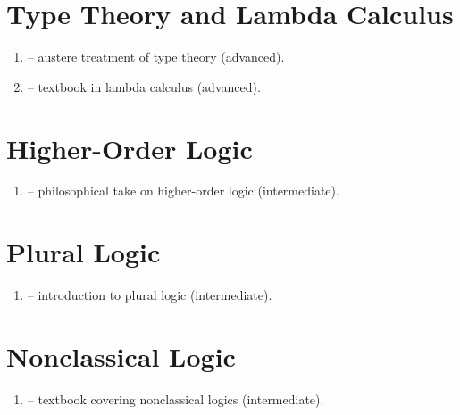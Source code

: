 \documentclass[a4paper, 11pt]{article} %
\begin{document}
\section*{Type Theory and Lambda Calculus}%
  \label{sec:TypeTheory}

  \begin{enumerate}
    \item \cite{hindley2008a} -- austere treatment of type theory (advanced).
    \item \cite{ hindley2008} -- textbook in lambda calculus (advanced).
  \end{enumerate}




\section*{Higher-Order Logic}%
  \label{sec:HigherOrderLogic}
  
  \begin{enumerate}
    \item \cite{Bacon2023} -- philosophical take on higher-order logic (intermediate).
  \end{enumerate}




\section*{Plural Logic}%
  \label{sec:PluralLogic}
  
  \begin{enumerate}
    \item \cite{Oliver2013} -- introduction to plural logic (intermediate).
  \end{enumerate}



\section*{Nonclassical Logic}%
  \label{sec:Nonclassical Logic}

  \begin{enumerate}
    \item \cite{Priest2008} -- textbook covering nonclassical logics (intermediate).
  \end{enumerate}



\setlength{\bibsep}{5pt} %
\end{document}
